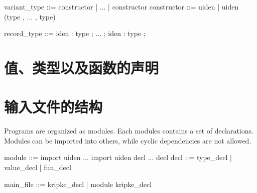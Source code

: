 {variant_type ::= constructor | ... | constructor
constructor  ::= uiden | uiden (type , ... , type) 

record_type  ::= { iden : type ; ... ; iden : type ;}

\section{值、类型以及函数的声明}

\section{输入文件的结构}
Programs are organized as modules. Each modules contains a set of declarations. Modules can be imported into others, while cyclic dependencies are not allowed.

module ::= 
import uiden ... import uiden
decl ... decl
decl   ::= type_decl | value_decl | fun_decl

main_file ::= kripke_decl | module kripke_decl
}
\cleardoublepage
